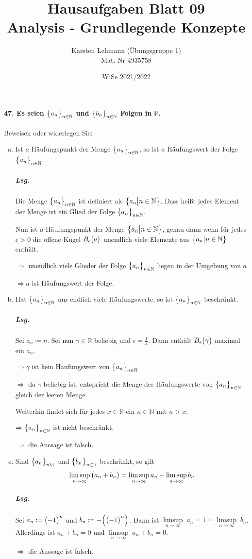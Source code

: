 \documentclass{scrreprt}
\author{Karsten Lehmann (Übungsgruppe 1)\\Mat. Nr 4935758}
\date{WiSe 2021/2022}
\title{Hausaufgaben Blatt 09\\Analysis - Grundlegende Konzepte}
\begin{document}
\paragraph{47. Es seien $\qty\big{a_n}_{n \in \mathbb{N}}$ und
  $\qty\big{b_n}_{n \in \mathbb{N}}$ Folgen in $\mathbb{R}$.}
Beweisen oder widerlegen Sie:
\begin{enumerate}[(a)]
\item Ist $a$ Häufungspunkt der Menge $\qty\big{a_n}_{n \in \mathbb{N}}$,
  so ist $a$ Häufungswert der Folge $\qty\big{a_n}_{n \in \mathbb{N}}$.

  \subparagraph{Lsg.} Die Menge $\qty\big{a_n}_{n \in \mathbb{N}}$ ist definiert
  als $\qty\big{a_n {\big |} n \in \mathbb{N}}$.
  Dass heißt jedes Element der Menge ist ein Glied der Folge
  $\qty\big{a_n}_{n \in \mathbb{N}}$.

  Nun ist $a$ Häufungspunkt der Menge
  $\qty\big{a_n {\big |} n \in \mathbb{N}}$, genau dann wenn
  für jedes $\epsilon > 0$ die offene Kugel $B_{\epsilon}\qty\big(a)$
  unendlich viele Elemente aus $\qty\big{a_n {\big |} n \in \mathbb{N}}$
  enthält.

  $\Rightarrow$ unendlich viele Glieder der Folge
  $\qty\big{a_n}_{n \in \mathbb{N}}$ liegen in der Umgebung von $a$

  $\Rightarrow a$ ist Häufungswert der Folge.

\item Hat $\qty\big{a_n}_{n \in \mathbb{N}}$ nur endlich viele Häufungswerte,
  so ist $\qty\big{a_n}_{n \in \mathbb{N}}$ beschränkt.

  \subparagraph{Lsg.} Sei $a_n \coloneqq n$.
  Sei nun $\gamma \in \mathbb{R}$ beliebig und $\epsilon = \frac{1}{3}$.
  Dann enthält $B_{\epsilon}\qty\big(\gamma)$ maximal ein $a_n$.

  $\Rightarrow \gamma$ ist kein Häufungswert von $\qty\big{a_n}_{n \in \mathbb{N}}$

  $\Rightarrow$ da $\gamma$ beliebig ist, entspricht die Menge der Häufungswerte
  von $\qty\big{a_n}_{n \in \mathbb{N}}$ gleich der leeren Menge.

  Weiterhin findet sich für jedes $x \in \mathbb{R}$ ein $n \in \mathbb{N}$ mit
  $n > x$.

  $\Rightarrow \qty\big{a_n}_{n \in \mathbb{N}}$ ist nicht beschränkt.

  $\Rightarrow$ die Aussage ist falsch.

\item Sind $\qty\big{a_n}_{n \i}$ und $\qty\big{b_n}_{n \in \mathbb{N}}$
  beschränkt, so gilt
  \[
    \limsup_{n \to \infty} \qty\big(a_n + b_n) =
    \limsup_{n \to \infty} a_n + \limsup_{n \to \infty} b_n
  \]

  \subparagraph{Lsg.} Sei $a_n \coloneqq \qty\big(-1)^n$ und
  $b_n \coloneqq -\qty\Big(\qty\big(-1)^n)$.
  Dann ist $\underset{n \to \infty}{\limsup} \; a_n = 1 =
  \underset{n \to \infty}{\limsup} \; b_n$.
  Allerdings ist $a_n + b_n = 0$ und
  $\underset{n \to \infty}{\limsup} \; a_n + b_n = 0$.

  $\Rightarrow$ die Aussage ist falsch.
\end{enumerate}
\end{document}
